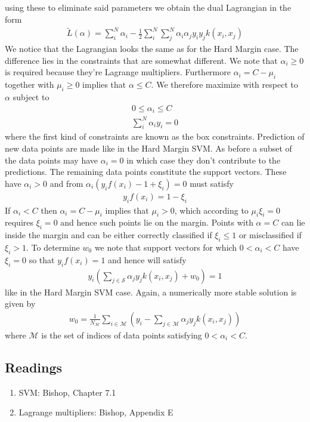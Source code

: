 \documentclass[main]{subfiles}
\begin{document}
using these to eliminate said parameters we obtain the dual Lagrangian in the form
\begin{align}
\tilde{L}(\alpha)=\sum_i^N \alpha_i - \frac{1}{2} \sum_i^N \sum_j^N \alpha_i \alpha_j y_i y_j k(x_i, x_j)
\end{align}
We notice that the Lagrangian looks the same as for the Hard Margin case. The difference lies in the constraints that are somewhat different. We note that $\alpha_i \geq 0$ is required because they're Lagrange multipliers. Furthermore $\alpha_i=C-\mu_i$ together with $\mu_i \geq 0$ implies that $\alpha \leq C$. We therefore maximize with respect to $\alpha$ subject to
\begin{align}
0 \leq \alpha_i \leq C \\
\sum_i^N \alpha_i y_i = 0
\end{align}
where the first kind of constraints are known as the box constraints. Prediction of new data points are made like in the Hard Margin SVM. As before a subset of the data points may have $\alpha_i=0$ in which case they don't contribute to the predictions. The remaining data points constitute the support vectors. These have $\alpha_i>0$ and from $\alpha_i(y_i f(x_i)-1+\xi_i) = 0$ must satisfy
\begin{align}
y_i f(x_i)=1-\xi_i
\end{align}
If $\alpha_i<C$ then $\alpha_i=C-\mu_i$ implies that $\mu_i>0$, which according to $\mu_i \xi_i = 0$ requires $\xi_i=0$ and hence such points lie on the margin. Points with $\alpha = C$ can lie inside the margin and can be either correctly classified if $\xi_i \leq 1$ or misclassified if $\xi_i > 1$. To determine $w_0$ we note that support vectors for which $0<\alpha_i<C$ have $\xi_i=0$ so that $y_i f(x_i)=1$ and hence will satisfy
\begin{align}
y_i(\sum_{j \in \mathcal{S}} \alpha_j y_j k(x_i, x_j) + w_0) = 1
\end{align}
like in the Hard Margin SVM case. Again, a numerically more stable solution is given by
\begin{align}
w_0=\frac{1}{N_{\mathcal{M}}} \sum_{i \in \mathcal{M}} (y_i - \sum_{j \in \mathcal{M}} \alpha_j y_j k(x_i, x_j))
\end{align}
where $\mathcal{M}$ is the set of indices of data points satisfying $0<\alpha_i<C$.
\subsection{Readings}
\begin{enumerate}
\item SVM: Bishop, Chapter 7.1
\item Lagrange multipliers: Bishop, Appendix E
\end{enumerate}
\end{document}
